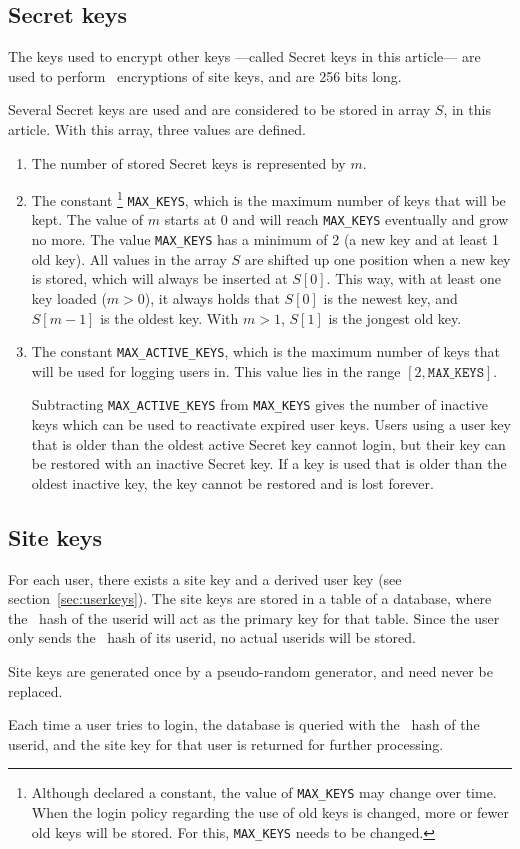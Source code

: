 \subsection{Secret keys}
\label{sec:secret_keys}
The keys used to encrypt other keys%
---called Secret keys in this article---%
are used to perform \AES\ encryptions of site keys,
and are 256 bits long.
\par
Several Secret keys are used and
are considered to be stored in array $S$, in this article.
With this array, three values are defined.
\begin{enumerate}
\item	The number of stored Secret keys is represented by $m$.
\item	The constant%
\footnote{Although declared a constant, the value of \texttt{MAX\_KEYS} may change over time.
When the login policy regarding the use of old keys is changed, more or fewer old keys will be stored.
For this, \texttt{MAX\_KEYS} needs to be changed.}
\texttt{MAX\_KEYS}, which is the maximum number of keys that will be kept.
The value of $m$ starts at 0 and will reach \texttt{MAX\_KEYS} eventually and grow no more.
The value \texttt{MAX\_KEYS} has a minimum of 2 (a new key and at least 1 old key).
All values in the array $S$ are shifted up one position when a new key is stored, which will always be inserted at $S[0]$.
This way, with at least one key loaded ($m>0$), it always holds that $S[0]$ is the newest key,
and $S[m-1]$ is the oldest key.
With $m>1$, $S[1]$ is the jongest old key.
\item	The constant \texttt{MAX\_ACTIVE\_KEYS},
which is the maximum number of keys that will be used for logging users in.
This value lies in the range $[2, \mathtt{MAX\_KEYS}]$.
\par
Subtracting \texttt{MAX\_ACTIVE\_KEYS} from \texttt{MAX\_KEYS}
gives the number of inactive keys which can be used to reactivate expired user keys.
Users using a user key that is older than the oldest active Secret key cannot login,
but their key can be restored with an inactive Secret key.
If a key is used that is older than the oldest inactive key,
the key cannot be restored and is lost forever.
\end{enumerate}

\subsection{Site keys}
For each user, there exists a site key and a derived user key (see section~\ref{sec:userkeys}).
The site keys are stored in a table of a database,
where the \SHA\ hash of the userid will act as the primary key for that table.
Since the user only sends the \SHA\ hash of its userid, no actual userids will be stored.
\par
Site keys are generated once by a pseudo-random generator, and need never be replaced.
\par
Each time a user tries to login,
the database is queried with the \SHA\ hash of the userid,
and the site key for that user is returned for further processing.

